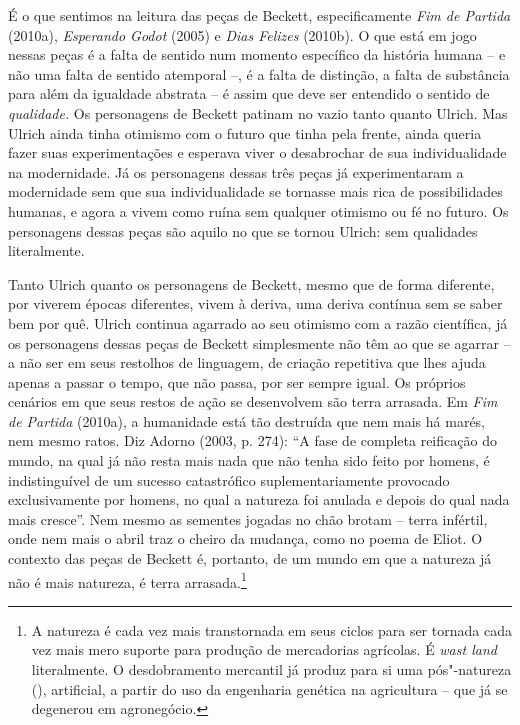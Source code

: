 É o que sentimos na leitura das peças de Beckett, especificamente
\emph{Fim de Partida} (2010a), \emph{Esperando Godot} (2005) e
\emph{Dias Felizes} (2010b). O que está em jogo nessas peças é a falta
de sentido num momento específico da história humana -- e não uma falta
de sentido atemporal --, é a falta de distinção, a falta de substância
para além da igualdade abstrata -- é assim que deve ser entendido o sentido de
\emph{qualidade.} Os personagens de Beckett patinam no vazio tanto
quanto Ulrich. Mas Ulrich ainda tinha otimismo com o futuro que tinha
pela frente, ainda queria fazer suas experimentações e esperava viver o
desabrochar de sua individualidade na modernidade. Já os personagens
dessas três peças já experimentaram a modernidade sem que sua
individualidade se tornasse mais rica de possibilidades humanas, e agora
a vivem como ruína sem qualquer otimismo ou fé no futuro. Os personagens
dessas peças são aquilo no que se tornou Ulrich: sem qualidades
literalmente.

Tanto Ulrich quanto os personagens de Beckett, mesmo que de forma
diferente, por viverem épocas diferentes, vivem à deriva, uma deriva
contínua sem se saber bem por quê. Ulrich continua agarrado ao seu
otimismo com a razão científica, já os personagens dessas peças de
Beckett simplesmente não têm ao que se agarrar -- a não ser em seus
restolhos de linguagem, de criação repetitiva que lhes ajuda apenas a
passar o tempo, que não passa, por ser sempre igual. Os próprios
cenários em que seus restos de ação se desenvolvem são terra arrasada.
Em \emph{Fim de Partida} (2010a), a humanidade está tão destruída
que nem mais há marés, nem mesmo ratos. Diz Adorno (2003, p. 274): ``A
fase de completa reificação do mundo, na qual já não resta mais nada que
não tenha sido feito por homens, é indistinguível de um sucesso
catastrófico suplementariamente provocado exclusivamente por homens, no
qual a natureza foi anulada e depois do qual nada mais cresce''. Nem
mesmo as sementes jogadas no chão brotam -- terra infértil, onde nem
mais o abril traz o cheiro da mudança, como no poema de Eliot. O
contexto das peças de Beckett é, portanto, de um mundo em que a natureza
já não é mais natureza, é terra arrasada.\footnote{A natureza é cada vez
  mais transtornada em seus ciclos para ser tornada cada vez mais mero
  suporte para produção de mercadorias agrícolas. É \emph{wast land}
  literalmente. O desdobramento mercantil já produz para si uma
  pós"-natureza (), artificial, a partir do uso da engenharia
  genética na agricultura -- que já se degenerou em agronegócio.}

